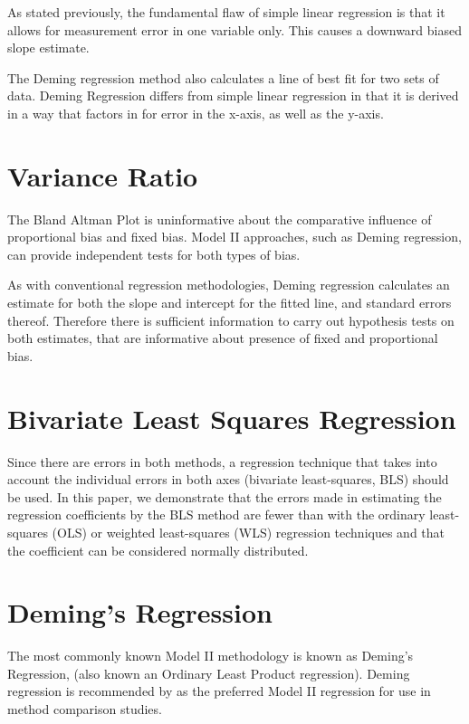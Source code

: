 \documentclass[12pt, a4paper]{report}
\theoremstyle{plain}
\theoremstyle{definition}
\theoremstyle{remark}
\begin{document}
As stated previously, the fundamental flaw of simple linear regression is that it allows for measurement error in one variable only. This causes a downward biased slope estimate.


The Deming regression method also calculates a line of best fit for two sets of data. Deming Regression differs from simple linear regression in that it is derived in a way that factors in for error in the x-axis, as well as the y-axis.


\section{Variance Ratio}
The Bland Altman Plot is uninformative about the comparative influence of proportional bias and fixed bias. Model II approaches, such as Deming regression,  can provide independent tests for
both types of bias.


As with conventional regression methodologies, Deming regression calculates an estimate for both the slope and intercept for the
fitted line, and standard errors thereof. Therefore there is sufficient information to carry out hypothesis tests on both
estimates, that are informative about presence of fixed and proportional bias.

\section{Bivariate Least Squares Regression} Since there
are errors in both methods, a regression technique that takes into account the individual errors in both axes (bivariate least-squares, BLS) should be used. In this paper, we demonstrate that the errors made in estimating the regression coefficients by the BLS method are fewer than with the ordinary least-squares (OLS) or weighted least-squares (WLS) regression techniques and that the coefficient can be considered normally distributed.


\section{Deming's Regression}
The most commonly known Model II methodology is known as Deming's Regression, (also known an Ordinary Least Product regression). Deming regression is recommended by \citet*{CornCoch} as the preferred Model II regression for use in method comparison studies. 
\end{document}
